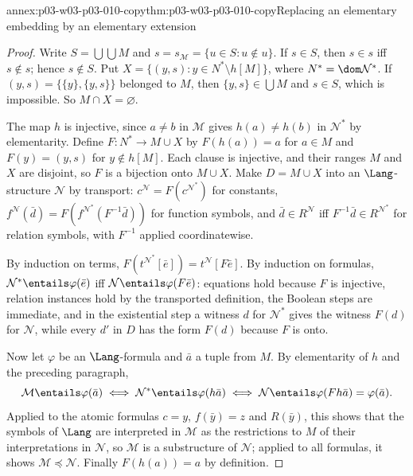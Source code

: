 \begin{annexitem}{annex:p03-w03-p03-010-copy}{thm:p03-w03-p03-010-copy}{Replacing an elementary embedding by an elementary extension}
\begin{proof}
Write \(S=\bigcup\bigcup M\) and \(s=s_{\mathcal M}=\{u\in S:u\notin u\}\).
If \(s\in S\), then \(s\in s\) iff \(s\notin s\); hence \(s\notin S\).
Put \(X=\{(y,s):y\in N^*\setminus h[M]\}\), where \(N^*=\dom\mathcal
N^*\).  If \((y,s)=\{\{y\},\{y,s\}\}\) belonged to \(M\), then
\(\{y,s\}\in\bigcup M\) and \(s\in S\), which is impossible.  So
\(M\cap X=\varnothing\).

The map \(h\) is injective, since \(a\ne b\) in \(\mathcal M\) gives
\(h(a)\ne h(b)\) in \(\mathcal N^*\) by elementarity.  Define
\(F:N^*\to M\cup X\) by \(F(h(a))=a\) for \(a\in M\) and \(F(y)=(y,s)\)
for \(y\notin h[M]\).  Each clause is injective, and their ranges \(M\) and
\(X\) are disjoint, so \(F\) is a bijection onto \(M\cup X\).  Make
\(D=M\cup X\) into an \(\Lang\)-structure \(\mathcal N\) by transport:
\(c^{\mathcal N}=F(c^{\mathcal N^*})\) for constants,
\(f^{\mathcal N}(\bar d)=F(f^{\mathcal N^*}(F^{-1}\bar d))\) for function
symbols, and \(\bar d\in R^{\mathcal N}\) iff
\(F^{-1}\bar d\in R^{\mathcal N^*}\) for relation symbols, with \(F^{-1}\)
applied coordinatewise.

By induction on terms, \(F(t^{\mathcal N^*}[\bar e])=t^{\mathcal
N}[F\bar e]\).  By induction on formulas, \(\mathcal
N^*\entails\varphi(\bar e)\) iff \(\mathcal N\entails\varphi(F\bar e)\):
equations hold because \(F\) is injective, relation instances hold by the
transported definition, the Boolean steps are immediate, and in the
existential step a witness \(d\) for \(\mathcal N^*\) gives the witness
\(F(d)\) for \(\mathcal N\), while every \(d'\) in \(D\) has the form
\(F(d)\) because \(F\) is onto.

Now let \(\varphi\) be an \(\Lang\)-formula and \(\bar a\) a tuple from
\(M\).  By elementarity of \(h\) and the preceding paragraph,
\[
  \mathcal M\entails\varphi(\bar a)
  \iff\mathcal N^*\entails\varphi(h\bar a)
  \iff\mathcal N\entails\varphi(F h\bar a)
  =\varphi(\bar a).
\]
Applied to the atomic formulas \(c=y\), \(f(\bar y)=z\) and \(R(\bar y)\),
this shows that the symbols of \(\Lang\) are interpreted in \(\mathcal M\) as
the restrictions to \(M\) of their interpretations in \(\mathcal N\), so
\(\mathcal M\) is a substructure of \(\mathcal N\); applied to all formulas,
it shows \(\mathcal M\preccurlyeq\mathcal N\).  Finally \(F(h(a))=a\) by
definition.
\end{proof}
\end{annexitem}

